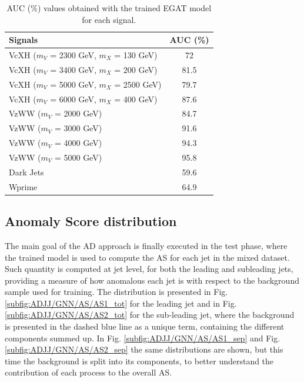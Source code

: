 \begin{table}[ht!]
\centering
\begin{tabular}{|l|c|}
\hline
\rowcolor{lightgray}
\textbf{Signals} & \textbf{AUC (\%)} \\
\hline\hline
VcXH ($m_V$ = 2300 GeV, $m_X$ = 130 GeV)       & 72 \\
\hline
VcXH ($m_V$ = 3400 GeV, $m_X$ = 200 GeV)        & 81.5 \\
\hline
VcXH ($m_V$ = 5000 GeV, $m_X$ = 2500 GeV)      & 79.7 \\
\hline
VcXH ($m_V$ = 6000 GeV, $m_X$ = 400 GeV)        & 87.6 \\
\hline\hline
VzWW ($m_V$ = 2000 GeV)            & 84.7 \\
\hline
VzWW ($m_V$ = 3000 GeV)          & 91.6 \\
\hline
VzWW ($m_V$ = 4000 GeV)            & 94.3 \\
\hline
VzWW ($m_V$ = 5000 GeV)             & 95.8 \\
\hline\hline
Dark Jets      & 59.6 \\
\hline
Wprime     & 64.9 \\
\hline
\end{tabular}
\caption{AUC (\%) values obtained with the trained EGAT model for each signal.}
\label{tab:ADJJ/GNN/results/AUC}
\end{table}


\subsection{Anomaly Score distribution}\label{sec:ADJJ/GNN/AS}

The main goal of the AD approach is finally executed in the test phase, where the trained model is used to compute the AS for each jet in the mixed dataset.
Such quantity is computed at jet level, for both the leading and subleading jets, providing a measure of how anomalous each jet is with respect to the background sample used for training.
The distribution is presented in Fig. \ref{subfig:ADJJ/GNN/AS/AS1_tot} for the leading jet and in Fig. \ref{subfig:ADJJ/GNN/AS/AS2_tot} for the sub-leading jet, where the background is presented in the dashed blue line as a unique term, containing the different components summed up.
In Fig. \ref{subfig:ADJJ/GNN/AS/AS1_sep} and Fig. \ref{subfig:ADJJ/GNN/AS/AS2_sep} the same distributions are shown, but this time the background is split into its components, to better understand the contribution of each process to the overall AS.\\

